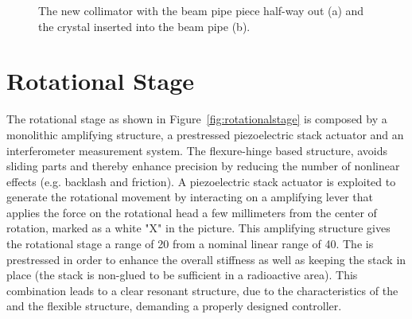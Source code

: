 \begin{figure}[tpb]
  \centering %
  \qquad
  \caption{\label{fig:collimator-t} The new collimator with the beam pipe piece half-way out (a) and the crystal inserted into the beam pipe (b).}
\end{figure}

\FloatBarrier
\section{Rotational Stage}
\label{sec:rotational_stage}
The rotational stage as shown in Figure~\ref{fig:rotationalstage} is composed by a monolithic amplifying structure, a prestressed piezoelectric stack actuator and an interferometer measurement system. The flexure-hinge based structure, avoids sliding parts and thereby enhance precision by reducing the number of nonlinear effects (e.g. backlash and friction). A piezoelectric stack actuator is exploited to generate the rotational movement by interacting on a amplifying lever that applies the force on the rotational head a few millimeters from the center of rotation, marked as a white "X" in the picture. This amplifying structure gives the rotational stage a range of \unit{20}{\milli\rad} from a nominal linear range of \unit{40}{\micro\meter}.  The \abbrPEA is prestressed in order to enhance the overall stiffness as well as keeping the stack in place (the stack is non-glued to be sufficient in a radioactive area). This combination leads to a clear resonant structure, due to the characteristics of the \abbrPEA and the flexible structure, demanding a properly designed controller.

